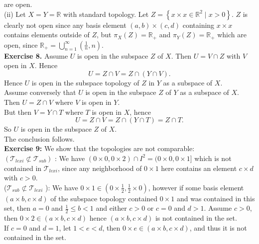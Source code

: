\documentclass[a4paper]{article}
\begin{document}
        are open.\\
        \linebreak
        (ii) Let $X=Y=\mathbb{R}$ with standard topology. 
        Let $Z = \left\{ x \times x \in \mathbb{R}^2 \mid x>0 \right\} $. $Z$ is
        clearly not open since any basis element $(a,b)\times (c,d)$ containing
        $x \times x$ contains elements outside of $Z$, but $\pi_X (Z) = \mathbb{R}_+$ and
        $\pi_Y (Z) = \mathbb{R}_{+}$ which are open, since $\mathbb{R}_+ =
        \bigcup_{n = 1}^{\infty} \left( \frac{1}{n},n \right) $.\\
        \linebreak
        \textbf{Exercise 8.}  Assume $U$ is open in the subspace $Z$ of $X$.
        Then $U = V \cap Z$ with $V$ open in $X$. Hence
        \[
        U = Z \cap V = Z \cap (Y \cap V)
        .\] 
        Hence $U$ is open in the subspace topology of $Z$ in $Y$ as a subspace
        of $X$.\\
        Assume conversely that $U$ is open in the subspace $Z$ of $Y$ as
        a subspace of $X$. Then $U = Z \cap V$ where $V$ is open in $Y$.\\
        But then $V = Y \cap T$ where $T$ is open in $X$, hence
        \[
        U = Z \cap V = Z \cap \left( Y \cap T \right) 
        = Z \cap T
        .\] 
        So $U$ is open in the subspace $Z$ of $X$.\\
        The conclusion follows.\\
        \linebreak
        \textbf{Exercise 9:} We show that the topologies are not comparable:\\
        $\left( \mathcal{T}_{lexi} \not \subset \mathcal{T}_{sub} \right) $ : 
        We have $(0\times 0 , 0\times 2) \cap I^2 = (0\times 0 , 0\times 1]$ 
        which is not contained in $\mathcal{T}_{lexi}$, since any neighborhood
        of $0\times 1$ here contains an element $c\times d$ with $c>0$.\\
        ($\mathcal{T}_{sub} \not \subset \mathcal{T}_{lexi}$ ):
        We have $ 0\times 1 \in  \left( 0 \times \frac{1}{2}, \frac{1}{2}\times
        0 \right) $,
        however if some basis element $(a \times b, c\times d)$
        of the subspace topology contained
        $0\times 1$ and was contained in this set, then
        $a=0$ and $\frac{1}{2}\le b < 1$ and either  $c>0$ or $c=0$ and $d>1$.
        Assume $c>0$, then $0 \times 2 \in (a\times b, c\times d)$ hence
        $(a \times b, c\times d)$ is not contained in the set.\\
        If $c=0$ and $d=1$, let $1 < e < d$, then
        $0 \times e \in (a \times b, c\times d)$, and thus it is not contained
        in the set.\\
\end{document}
